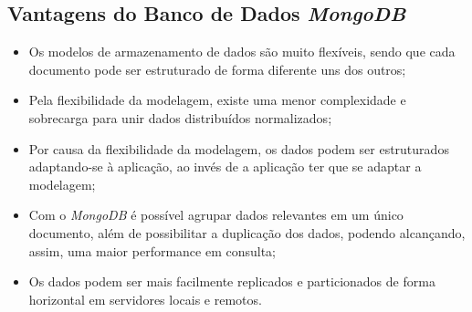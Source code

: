
\subsection{Vantagens do Banco de Dados \textit{MongoDB}}

\begin{itemize}
    \item Os modelos de armazenamento de dados são muito flexíveis, sendo que cada documento pode ser estruturado de forma diferente uns dos outros;
    
    \item Pela flexibilidade da modelagem, existe uma menor complexidade e sobrecarga para unir dados distribuídos normalizados;
    
    \item Por causa da flexibilidade da modelagem, os dados podem ser estruturados adaptando-se à aplicação, ao invés de a aplicação ter que se adaptar a modelagem;
    
    \item Com o \textit{MongoDB} é possível agrupar dados relevantes em um único documento, além de possibilitar a duplicação dos dados, podendo alcançando, assim, uma maior performance em consulta;
    
    
    
    
    \item Os dados podem ser mais facilmente replicados e particionados de forma horizontal em servidores locais e remotos.
\end{itemize}
    
